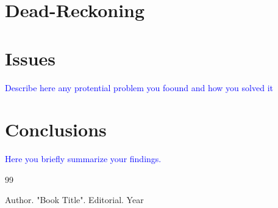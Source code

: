 \documentclass[letterpaper,12pt]{article}
\begin{document}
\section{Dead-Reckoning}
\label{sec:Dead-Reckoning}
\section{Issues}
\label{sec:Issues}
\textcolor{blue}{Describe here any protential problem you foound and how you solved it}
\section{Conclusions}
\label{sec:Conclussions}
\textcolor{blue}{Here you briefly summarize your findings.}


\begin{thebibliography}{99}

Author. "Book Title". Editorial. Year
\end{thebibliography}
\end{document}
